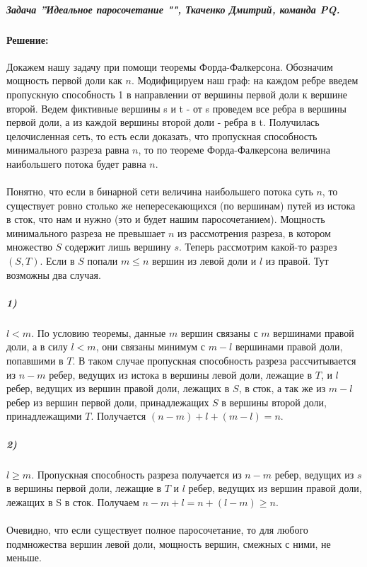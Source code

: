\documentclass{article}
\begin{document}
\subparagraph{\textit{ Задача ''Идеальное паросочетание "", Ткаченко Дмитрий, команда PQ.}}
\paragraph{Решение:} Докажем нашу задачу при помощи теоремы Форда-Фалкерсона. Обозначим мощность первой доли как $n$. Модифицируем наш граф: на каждом ребре введем пропускную способность 1 в направлении от вершины первой доли к вершине второй. Ведем фиктивные вершины s и t - от s проведем все ребра в вершины первой доли, а из каждой вершины второй доли - ребра в t. Получилась целочисленная сеть, то есть если доказать, что пропускная способность минимального разреза равна $n$, то по теореме Форда-Фалкерсона величина наибольшего потока будет равна $n$.
\paragraph{\Leftarrow} Понятно, что если в бинарной сети величина наибольшего потока суть $n$, то существует ровно столько же непересекающихся (по вершинам) путей из истока в сток, что нам и нужно (это и будет нашим паросочетанием). 
\newline
	Мощность минимального разреза не превышает $n$ из рассмотрения разреза, в котором множество $S$ содержит лишь вершину $s$.
\newline
	Теперь рассмотрим какой-то разрез $(S,T)$. Если в $S$ попали $m \le n$ вершин из левой доли и $l$ из правой. Тут возможны два случая.
\subparagraph{1)} $l < m$. По условию теоремы, данные $m$ вершин связаны с $m$ вершинами правой доли, а в силу $l < m$, они связаны минимум с $m - l$ вершинами правой доли, попавшими в $T$. В таком случае пропускная способность разреза рассчитывается из $n-m$ ребер, ведущих из истока в вершины левой доли, лежащие в $T$, и $l$ ребер, ведущих из вершин правой доли, лежащих в $S$, в сток, а так же из $m-l$ ребер из вершин первой доли, принадлежащих $S$ в вершины второй доли, принадлежащими $T$. Получается $(n - m) + l + (m - l) = n$.
\subparagraph{2)} $l \ge m$. Пропускная способность разреза получается из $n-m$ ребер, ведущих из $s$ в вершины первой доли, лежащие в $T$ и $l$ ребер, ведущих из вершин правой доли, лежащих в S в сток. Получаем $n - m + l = n + (l - m) \ge n$.
\paragraph{\Rightarrow} Очевидно, что если существует полное паросочетание, то для любого подмножества вершин левой доли, мощность вершин, смежных с ними, не меньше. 
\end{document}
